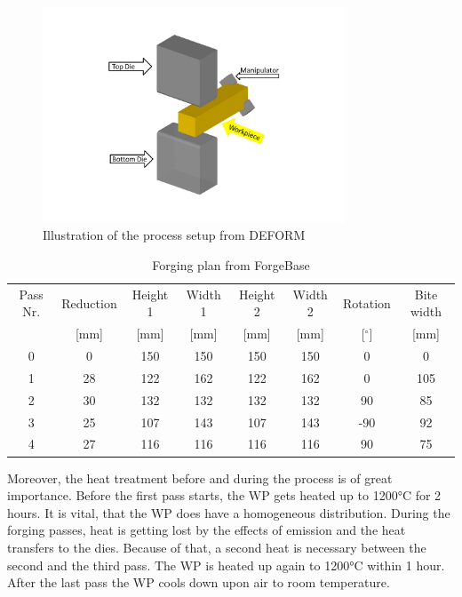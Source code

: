 \begin{figure}[htbp]
 \centering
 \includegraphics[width=0.8\textwidth]{images/processsetup}
 \caption{Illustration of the process setup from DEFORM}
 \label{img:processsetup}
\end{figure}

\begin{table}[htbp]%
 \footnotesize
 \centering
 \caption{Forging plan from ForgeBase}
 \begin{tabular}{|c|c|c|c|c|c|c|c|}
 \hline
 Pass Nr.&Reduction&Height 1&Width 1&Height 2&Width 2&Rotation&Bite width\\
 & [mm] & [mm] & [mm] & [mm] & [mm] & [$^{\circ}$] & [mm]\\
 \hline
 0&0&150&150&150&150&0&0\\
 \hline
 1&28&122&162&122&162&0&105\\
 \hline
 2&30&132&132&132&132&90&85\\
 \hline
 3&25&107&143&107&143&-90&92\\
 \hline
 4&27&116&116&116&116&90&75\\
 \hline
 \end{tabular}
 \label{table:forgingplan}
\end{table}

Moreover, the heat treatment before and during the process is of great importance. Before the first pass starts, the WP gets heated up to 1200°C for 2 hours. It is vital, that the WP does have a homogeneous distribution. During the forging passes, heat is getting lost by the effects of emission and the heat transfers to the dies. Because of that, a second heat is necessary between the second and the third pass. The WP is heated up again to 1200°C within 1 hour. After the last pass the WP cools down upon air to room temperature.
